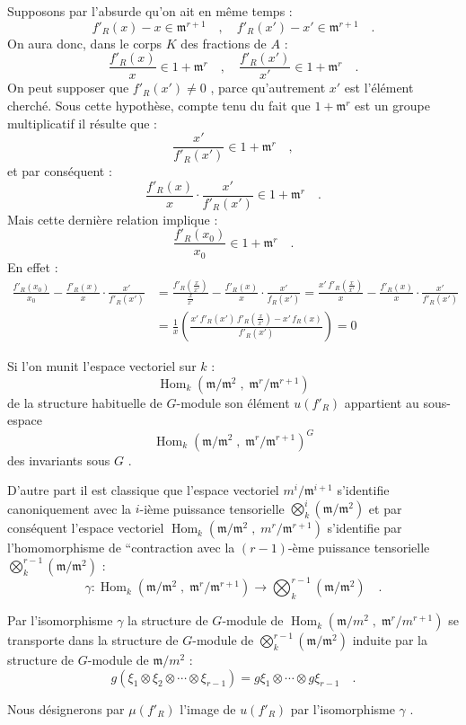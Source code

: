 \documentclass[11pt]{article}
\providecommand{\fm}{\mathfrak{m}}
\DeclareMathOperator{\Hom}{Hom}
\providecommand{\Hom}{\operatorname{Hom}}
\providecommand{\fm}{\mathfrak m}
\providecommand{\Hom}{\operatorname{Hom}}
\begin{document}
Supposons par l'absurde qu'on ait en même temps :
\[
f'_R(x) - x \in \fm^{r+1} \quad , \quad f'_R(x') - x' \in \fm^{r+1} \quad .
\]
On aura donc, dans le corps $K$ des fractions de $A$ :
\[
\frac{f'_R(x)}{x} \in 1 + \fm^r \quad , \quad \frac{f'_R(x')}{x'} \in 1 + \fm^r \quad .
\]
On peut supposer que $f'_R(x') \neq 0$ , parce qu'autrement $x'$ est l'élément cherché. Sous cette hypothèse, compte tenu du fait que $1 + \fm^r$ est un groupe multiplicatif il résulte que :
\[
\frac{x'}{f'_R(x')} \in 1 + \fm^r \quad ,
\]
et par conséquent :
\[
\frac{f'_R(x)}{x} \cdot \frac{x'}{f'_R(x')} \in 1 + \fm^r \quad .
\]
Mais cette dernière relation implique :
\[
\frac{f'_R(x_0)}{x_0} \in 1 + \fm^r \quad .
\]
En effet :
\[
\begin{aligned}
\frac{f'_R(x_0)}{x_0} - \frac{f'_R(x)}{x} \cdot \frac{x'}{f'_R(x')}
&= \frac{f'_R(\frac{x}{x'})}{\frac{x}{x'}} - \frac{f'_R(x)}{x} \cdot \frac{x'}{f_R(x')}
= \frac{x'\,f'_R(\frac{x}{x'})}{x} - \frac{f'_R(x)}{x} \cdot \frac{x'}{f'_R(x')} \\
&= \frac{1}{x}\left(\frac{x'\,f'_R(x')\,f'_R(\frac{x}{x'}) - x'\,f_R(x)}{f'_R(x')}\right) = 0
\end{aligned}
\]

Si l'on
munit l'espace vectoriel sur $k$ :
\[
\Hom_k(\fm/\fm^2 \; , \; \fm^r/\fm^{r+1})
\]
de la structure habituelle de $G$-module son élément $u(f'_R)$ appartient au sous-espace
\[
\Hom_k(\fm/\fm^2 \; , \; \fm^r/\fm^{r+1})^G
\]
des invariants sous $G$ .

D'autre part il est classique que l'espace vectoriel $m^i/\fm^{i+1}$ s'identifie canoniquement avec la $i$-ième puissance tensorielle $\bigotimes_k^i (\fm/\fm^2)$ et par conséquent l'espace vectoriel $\Hom_k(\fm/\fm^2 \; , \; m^r/\fm^{r+1})$ s'identifie par l'homomorphisme de ``contraction avec la $(r-1)$-ème puissance tensorielle $\bigotimes_k^{r-1}(\fm/\fm^2)$ :
\[
\gamma : \Hom_k(\fm/\fm^2 \; , \; \fm^r/\fm^{r+1}) \longrightarrow \bigotimes_k^{r-1}(\fm/\fm^2) \quad .
\]

Par l'isomorphisme $\gamma$ la structure de $G$-module de $\Hom_k(\fm/m^2 \; , \; \fm^r/m^{r+1})$ se transporte dans la structure de $G$-module de $\bigotimes_k^{r-1}(\fm/\fm^2)$ induite par la structure de $G$-module de $\fm/m^2$ :
\[
g(\xi_1 \otimes \xi_2 \otimes \cdots \otimes \xi_{r-1}) = g\xi_1 \otimes \cdots \otimes g\xi_{r-1} \quad .
\]

Nous désignerons par $\mu(f'_R)$ l'image de $u(f'_R)$ par l'isomorphisme $\gamma$ .
\end{document}
